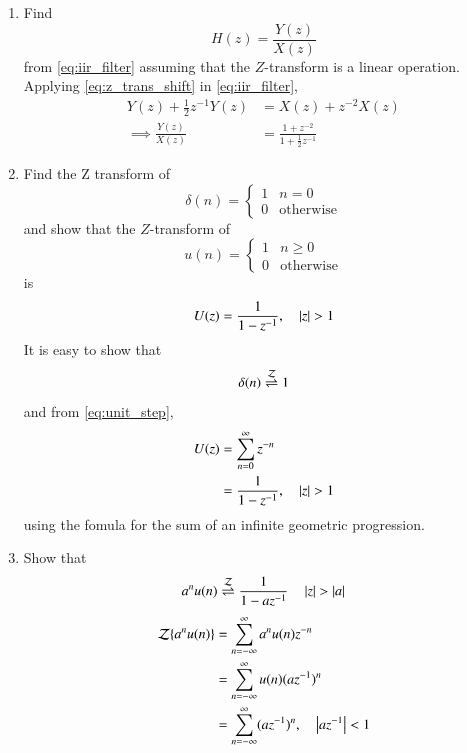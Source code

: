 \documentclass[journal,12pt,twocolumn]{IEEEtran}
\renewcommand\thesection{\arabic{section}}
\begin{document}
\begin{enumerate}[label=\thesection.\arabic*]
\item Find
%
\begin{equation}
H(z) = \frac{Y(z)}{X(z)}
\end{equation}
%
from  \eqref{eq:iir_filter} assuming that the $Z$-transform is a linear operation.
\\
\solution  Applying \eqref{eq:z_trans_shift} in \eqref{eq:iir_filter},
\begin{align}
Y(z) + \frac{1}{2}z^{-1}Y(z) &= X(z)+z^{-2}X(z)
\\
\implies \frac{Y(z)}{X(z)} &= \frac{1 + z^{-2}}{1 + \frac{1}{2}z^{-1}}
\label{eq:freq_resp}
\end{align}
%
\item Find the Z transform of 
\begin{equation}
\delta(n)
=
\begin{cases}
1 & n = 0
\\
0 & \text{otherwise}
\end{cases}
\end{equation}
and show that the $Z$-transform of
\begin{equation}
\label{eq:unit_step}
u(n)
=
\begin{cases}
1 & n \ge 0
\\
0 & \text{otherwise}
\end{cases}
\end{equation}
is
\begin{equation}
U(z) = \frac{1}{1-z^{-1}}, \quad \left\vert z\right\vert > 1
\end{equation}
\solution It is easy to show that
\begin{equation}
\delta(n) \overset{\mathcal{Z}}{ \rightleftharpoons} 1
\end{equation}
and from \eqref{eq:unit_step},
\begin{align}
U(z) &= \sum _{n= 0}^{\infty}z^{-n}
\\
&=\frac{1}{1-z^{-1}}, \quad \left\vert z\right\vert > 1
\end{align}
using the fomula for the sum of an infinite geometric progression.
%
\item Show that 
\begin{equation}
\label{eq:anun}
a^nu(n) \overset{\mathcal{Z}}{ \rightleftharpoons} \frac{1}{1-az^{-1}} \quad \left\vert z\right\vert > \left\vert a\right\vert
\end{equation}
\solution
\begin{align}
{\mathcal {Z}}\{a^nu(n)\} &=\sum _{n=-\infty }^{\infty }a^nu(n)z^{-n}
\\
&=\sum _{n=-\infty }^{\infty }u(n) (az^{-1})^{n}
\\
&=\sum _{n=-\infty }^{\infty }(az^{-1})^{n} , \quad \abs{az^{-1}} < 1\\

\end{align}
\end{enumerate}
\end{document}
